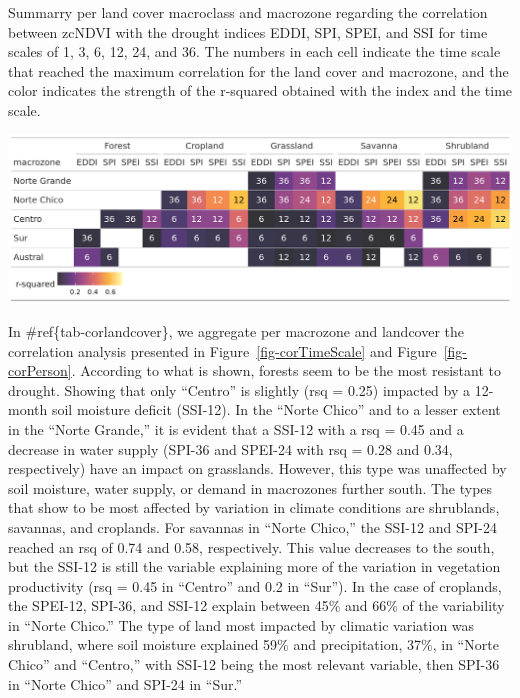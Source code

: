 \documentclass[
  authoryear,
  preprint,
  3p,
  onecolumn]{elsarticle}
\begin{document}
\begin{table}[!ht]
\caption{Summarry per land cover macroclass and macrozone regarding the correlation between zcNDVI with the drought indices EDDI, SPI, SPEI, and SSI for time scales of 1, 3, 6, 12, 24, and 36. The numbers in each cell indicate the time scale that reached the maximum correlation for the land cover and macrozone, and the color indicates the strength of the r-squared obtained with the index and the time scale.}
\label{tab-corlandcover}
\includegraphics[]{../output/figs/tabla_r_cor_macro_indice.png}
\end{table}

In \#ref\{tab-corlandcover\}, we aggregate per macrozone and landcover
the correlation analysis presented in Figure~\ref{fig-corTimeScale} and
Figure~\ref{fig-corPerson}. According to what is shown, forests seem to
be the most resistant to drought. Showing that only ``Centro'' is
slightly (rsq = 0.25) impacted by a 12-month soil moisture deficit
(SSI-12). In the ``Norte Chico'' and to a lesser extent in the ``Norte
Grande,'' it is evident that a SSI-12 with a rsq = 0.45 and a decrease
in water supply (SPI-36 and SPEI-24 with rsq = 0.28 and 0.34,
respectively) have an impact on grasslands. However, this type was
unaffected by soil moisture, water supply, or demand in macrozones
further south. The types that show to be most affected by variation in
climate conditions are shrublands, savannas, and croplands. For savannas
in ``Norte Chico,'' the SSI-12 and SPI-24 reached an rsq of 0.74 and
0.58, respectively. This value decreases to the south, but the SSI-12 is
still the variable explaining more of the variation in vegetation
productivity (rsq = 0.45 in ``Centro'' and 0.2 in ``Sur''). In the case
of croplands, the SPEI-12, SPI-36, and SSI-12 explain between 45\% and
66\% of the variability in ``Norte Chico.'' The type of land most
impacted by climatic variation was shrubland, where soil moisture
explained 59\% and precipitation, 37\%, in ``Norte Chico'' and
``Centro,'' with SSI-12 being the most relevant variable, then SPI-36 in
``Norte Chico'' and SPI-24 in ``Sur.''
\end{document}
